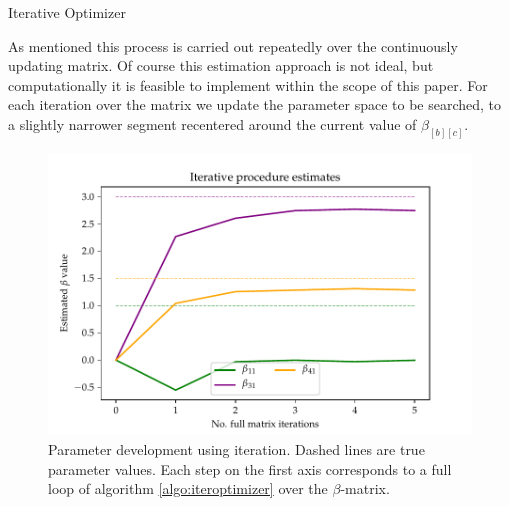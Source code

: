 \begin{algorithm}[H]
  \label{algo:iteroptimizer}

  \caption{Iterative Optimizer}

  \footnotesize
  \DontPrintSemicolon
\end{algorithm}

As mentioned this process is carried out repeatedly over the continuously updating matrix. Of course this estimation approach is not ideal, but computationally it is feasible to implement within the scope of this paper. For each iteration over the matrix we update the parameter space to be searched, to a slightly narrower segment recentered around the current value of $\beta_{[b][c]}$.

\begin{figure}[h]
  \centering
  \includegraphics[width=0.8\linewidth]{03_figures/iterEstimate.pdf}
  \caption[Parameter development using iteration.]{Parameter development using iteration. Dashed lines are true parameter values. Each step on the first axis corresponds to a full loop of algorithm \ref{algo:iteroptimizer} over the $\beta$-matrix.}
  \label{fig: iterbetas}
\end{figure}

